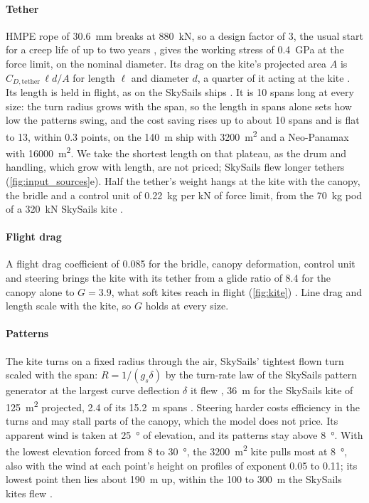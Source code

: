 \paragraph{Tether} HMPE rope of \SI{30.6}{mm} breaks at \SI{880}{kN}, so a design factor of 3, the usual start for a creep life of up to two years \citep{bosman2013}, gives the working stress of \SI{0.4}{GPa} at the force limit, on the nominal diameter. Its drag on the kite's projected area $A$ is $C_{D,\mathrm{tether}}\,\ell d/A$ for length $\ell$ and diameter $d$, a quarter of it acting at the kite \citep{vandervlugt2019}. Its length is held in flight, as on the SkySails ships \citep{erhard2013}. It is 10 spans long at every size: the turn radius grows with the span, so the length in spans alone sets how low the patterns swing, and the cost saving rises up to about 10 spans and is flat to 13, within 0.3 points, on the \SI{140}{m} ship with \SI{3200}{m^2} and a Neo-Panamax with \SI{16000}{m^2}. We take the shortest length on that plateau, as the drum and handling, which grow with length, are not priced; SkySails flew longer tethers (\cref{fig:input_sources}e).  Half the tether's weight hangs at the kite with the canopy, the bridle and a control unit of \SI{0.22}{kg} per kN of force limit, from the \SI{70}{kg} pod of a \SI{320}{kN} SkySails kite \citep{paulig2013}.

\paragraph{Flight drag} A flight drag coefficient of 0.085 for the bridle, canopy deformation, control unit and steering brings the kite with its tether from a glide ratio of 8.4 for the canopy alone to $G=3.9$, what soft kites reach in flight (\cref{fig:kite}) \citep{oehler2019}. Line drag and length scale with the kite, so $G$ holds at every size.

\paragraph{Patterns} The kite turns on a fixed radius through the air, SkySails' tightest flown turn scaled with the span: $R = 1/(g_s\delta)$ by the turn-rate law of the SkySails pattern generator at the largest curve deflection $\delta$ it flew \citep[Eq.~7]{erhard2013}, \SI{36}{m} for the SkySails kite of \SI{125}{m^2} projected, 2.4 of its \SI{15.2}{m} spans \citep{folkersma2020}. Steering harder costs efficiency in the turns and may stall parts of the canopy, which the model does not price. Its apparent wind is taken at \SI{25}{\degree} of elevation, and its patterns stay above \SI{8}{\degree}. With the lowest elevation forced from 8 to \SI{30}{\degree}, the \SI{3200}{m^2} kite pulls most at \SI{8}{\degree}, also with the wind at each point's height on profiles of exponent 0.05 to 0.11; its lowest point then lies about \SI{190}{m} up, within the 100 to \SI{300}{m} the SkySails kites flew \citep{noaa2009}.

